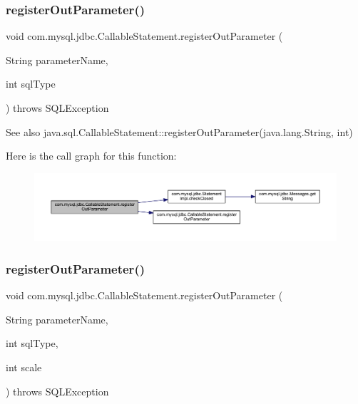 \subsubsection{\texorpdfstring{register\+Out\+Parameter()}{registerOutParameter()}\hspace{0.1cm}{\footnotesize\ttfamily [4/6]}}
{\footnotesize\ttfamily void com.\+mysql.\+jdbc.\+Callable\+Statement.\+register\+Out\+Parameter (\begin{DoxyParamCaption}\item[{String}]{parameter\+Name,  }\item[{int}]{sql\+Type }\end{DoxyParamCaption}) throws S\+Q\+L\+Exception}

\begin{DoxySeeAlso}{See also}
java.\+sql.\+Callable\+Statement\+::register\+Out\+Parameter(java.\+lang.\+String, int) 
\end{DoxySeeAlso}
Here is the call graph for this function\+:\nopagebreak
\begin{figure}[H]
\begin{center}
\leavevmode
\includegraphics[width=350pt]{classcom_1_1mysql_1_1jdbc_1_1_callable_statement_a89d67ced2bd6cc64c13f0eb502d9991c_cgraph}
\end{center}
\end{figure}
\mbox{\label{classcom_1_1mysql_1_1jdbc_1_1_callable_statement_aac8fb04a2335f34f237458370e44eb19}} 
\subsubsection{\texorpdfstring{register\+Out\+Parameter()}{registerOutParameter()}\hspace{0.1cm}{\footnotesize\ttfamily [5/6]}}
{\footnotesize\ttfamily void com.\+mysql.\+jdbc.\+Callable\+Statement.\+register\+Out\+Parameter (\begin{DoxyParamCaption}\item[{String}]{parameter\+Name,  }\item[{int}]{sql\+Type,  }\item[{int}]{scale }\end{DoxyParamCaption}) throws S\+Q\+L\+Exception}

